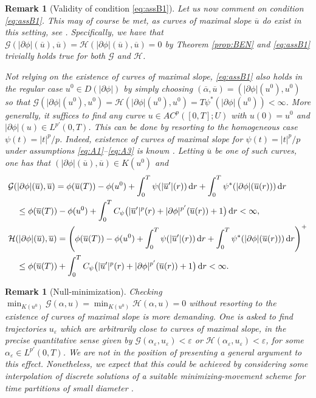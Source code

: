 \documentclass[reqno]{amsart}
\newcommand{\epsi}{\varepsilon}
\newcommand{\dr}{{\rm d} r}
\newcommand{\ove}{\overline}
\renewcommand{\sl}{|\partial \phi|}
\newcommand{\GG}{{\mathcal G}}
\newcommand{\HH}{{\mathcal H}}
\renewcommand{\d}{{\rm d}}
\newtheorem{remark}[theorem]{Remark}
\begin{document}
\begin{remark}[Validity of condition \eqref{eq:assB1}]
   Let us now comment on condition \eqref{eq:assB1}. This may of
  course  be met,  as curves of maximal slope $\ove u$ do exist in this setting,  see \cite{cuore3}.  Specifically, we have that
  $\GG (\sl(\ove u),\ove u) = \HH (\sl(\ove u),\ove u)=0$  by Theorem \ref{prop:BEN}  and
   \eqref{eq:assB1} trivially holds true  for both $\GG$ and
  $\HH$. 

  Not relying on the existence of curves of maximal slope,
  \eqref{eq:assB1} also holds in the regular case $u^0 \in D(\sl)$ by
  simply choosing $(\ove \alpha, \ove u)=(\sl (u^0),u^0)$ so that
  $\GG (\sl (u^0),u^0) = \HH(\sl (u^0),u^0) =T
  \psi^*(\sl(u^0))<\infty$. More generally, it suffices to find any
  curve $u \in AC^p([0,T];U)$ with $u(0)=u^0$ and
  $\sl (u)\in L^{p'}(0,T)$. This can be done by resorting to the
  homogeneous case $\psi(t)=|t|^p/p$. Indeed, existence of curves of
  maximal slope for $\psi(t)=|t|^p/p$ under assumptions
  \eqref{eq:A1}--\eqref{eq:A3} is known \cite[Rem.~3.2.5,
  p.~69]{Ambrosio08}.  Letting $\ove u$ be one of such curves, one has
  that $(\sl(\ove u),\ove u)\in K(u^0)$ and
  \begin{align*}
    &\GG (\sl(\ove u),\ove u) = \phi(\ove u(T)) - \phi(u^0) +
      \int_0^T\psi(|\ove u'|(r))\, \dr + \int_0^T
      \psi^*(\sl(\ove u(r)))\, \d r \\
    & \quad \leq \phi(\ove u(T)) - \phi(u^0) +
      \int_0^T C_\psi \big(  |\ove u'|^p(r) + \sl^{p'}(\ove u(r)) +1\big)\, \d
      r <\infty, \\
    & \HH (\sl(\ove u),\ove u) = \left(\phi(\ove u(T)) - \phi(u^0) +
      \int_0^T\psi(|\ove u'|(r))\, \dr + \int_0^T
      \psi^*(\sl(\ove u(r)))\, \d r\right)^+ \\
    & \quad  \leq \phi(\ove u(T)) +
      \int_0^T C_\psi \big(  |\ove u'|^p(r) + \sl^{p'}(\ove u(r)) +1\big)\, \d
      r <\infty.
  \end{align*}
\end{remark}
\begin{remark}[Null-minimization]
   Checking
  $\min_{K(u^0)}\GG(\alpha,u) = \min_{K(u^0)}\HH(\alpha,u) = 0$
  without resorting to the existence of curves of maximal slope 
  is
  more demanding. One is asked to find trajectories $u_\epsi$ which
  are arbitrarily close to curves of maximal slope, in the precise
quantitative sense given by
  $\GG ( \alpha_\epsi, u_\epsi)<\epsi$  or
  $ \HH ( \alpha_\epsi, u_\epsi)<\epsi$, for some $\alpha_\epsi \in
  L^{p'}(0,T)$. We are not in the
  position of presenting a general argument to this
  effect. Nonetheless, we expect that this could be achieved by
  considering some interpolation of discrete
  solutions of a suitable minimizing-movement scheme for time
  partitions of small diameter \cite{cuore3}. 
\end{remark}
 
\end{document}
